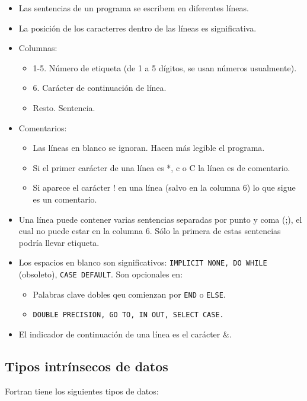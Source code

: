 \begin{itemize}
	\item Las sentencias de un programa se escribem en diferentes líneas.
	\item La posición de los caracterres dentro de las líneas es significativa.
	\item Columnas:
	      \begin{itemize}
		      \item 1-5. Número de etiqueta (de 1 a 5 dígitos, se usan números usualmente).
		      \item 6. Carácter de continuación de línea.
		      \item Resto. Sentencia.
	      \end{itemize}
	\item Comentarios:
	      \begin{itemize}
		      \item Las líneas en blanco se ignoran. Hacen más legible el programa.
		      \item Si el primer carácter de una línea es *, c o C la línea es de comentario.
		      \item Si aparece el carácter ! en una línea (salvo en la columna 6) lo que sigue es un comentario.
	      \end{itemize}
	\item Una línea puede contener varias sentencias separadas por punto y coma (;), el cual no puede estar en la columna 6. Sólo la primera de estas sentencias podría llevar etiqueta.
	\item Los espacios en blanco son significativos: {\tt IMPLICIT NONE, DO WHILE} (obsoleto), {\tt CASE DEFAULT}. Son opcionales en:
	      \begin{itemize}
		      \item Palabras clave dobles qeu comienzan por {\tt END} o {\tt ELSE}.
		      \item {\tt DOUBLE PRECISION, GO TO, IN OUT, SELECT CASE.}
	      \end{itemize}
	\item  El indicador de continuación de una línea es el carácter \&.
\end{itemize}

\subsection{Tipos intrínsecos de datos}

Fortran tiene los siguientes tipos de datos:

